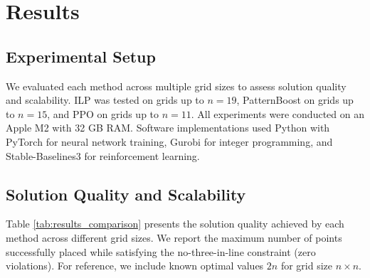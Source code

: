 \documentclass{article}
\theoremstyle{plain}
\theoremstyle{definition}
\theoremstyle{remark}
\begin{document}
\begin{table}[htbp]
\vspace{0.1in}
\begin{center}
\begin{small}
\begin{sc}
\caption{SciML Gradient Flow Hyperparameters}
\label{tab:sciml_hyperparams}
\end{sc}
\end{small}
\end{center}
\vspace{0.1in}
\end{table}

\section{Results}


\subsection{Experimental Setup}

We evaluated each method across multiple grid sizes to assess solution quality and scalability. ILP was tested on grids up to $n = 19$, PatternBoost on grids up to $n = 15$, and PPO on grids up to $n = 11$. All experiments were conducted on an Apple M2 with 32 GB RAM. Software implementations used Python with PyTorch for neural network training, Gurobi for integer programming, and Stable-Baselines3 for reinforcement learning.

\subsection{Solution Quality and Scalability}

Table \ref{tab:results_comparison} presents the solution quality achieved by each method across different grid sizes. We report the maximum number of points successfully placed while satisfying the no-three-in-line constraint (zero violations). For reference, we include known optimal values $2n$ for grid size $n \times n$.
\end{document}
